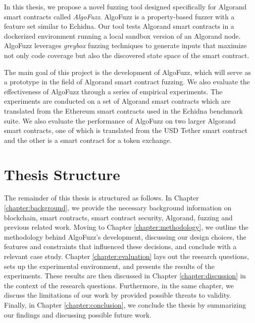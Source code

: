 In this thesis, we propose a novel fuzzing tool designed specifically for Algorand smart contracts called \textit{AlgoFuzz}.
AlgoFuzz is a property-based fuzzer with a feature set similar to Echidna.
Our tool tests Algorand smart contracts in a dockerized environment running a local sandbox version of an Algorand node.
AlgoFuzz leverages \textit{greybox} fuzzing techniques to generate inputs that maximize not only code coverage but also the discovered state space of the smart contract.

The main goal of this project is the development of AlgoFuzz, which will serve as a prototype in the field of Algorand smart contract fuzzing.
We also evaluate the effectiveness of AlgoFuzz  through a series of empirical experiments.
The experiments are conducted on a set of Algorand smart contracts which are translated from the Ethereum smart contracts used in the Echidna benchmark suite.
We also evaluate the performance of AlgoFuzz on two larger Algorand smart contracts, one of which is translated from the USD Tether smart contract and the other is a smart contract for a token exchange.

\section*{Thesis Structure}
The remainder of this thesis is structured as follows.
In Chapter \ref{chapter:background}, we provide the necessary background information on blockchain, smart contracts, smart contract security, Algorand, fuzzing and previous related work.
Moving to Chapter \ref{chapter:methodology}, we outline the methodology behind AlgoFuzz's development, discussing our design choices, the features and constraints that influenced these decisions, and conclude with a relevant case study.
Chapter \ref{chapter:evaluation} lays out the research questions, sets up the experimental environment, and presents the results of the experiments.
These results are then discussed in Chapter \ref{chapter:discussion} in the context of the research questions. Furthermore, in the same chapter, we discuss the limitations of our work by provided possible threats to validity.
Finally, in Chapter \ref{chapter:conclusion}, we conclude the thesis by summarizing our findings and discussing possible future work.



